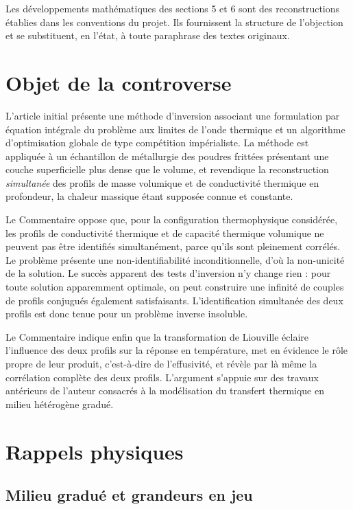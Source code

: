 \documentclass[11pt,a4paper]{article}
\begin{document}
Les développements mathématiques des sections 5 et 6 sont des reconstructions établies dans les
conventions du projet. Ils fournissent la structure de l'objection et se substituent, en l'état, à toute
paraphrase des textes originaux.

\section{Objet de la controverse}

L'article initial présente une méthode d'inversion associant une formulation par équation intégrale du
problème aux limites de l'onde thermique et un algorithme d'optimisation globale de type compétition
impérialiste. La méthode est appliquée à un échantillon de métallurgie des poudres frittées présentant
une couche superficielle plus dense que le volume, et revendique la reconstruction \emph{simultanée} des
profils de masse volumique et de conductivité thermique en profondeur, la chaleur massique étant
supposée connue et constante.

Le Commentaire oppose que, pour la configuration thermophysique considérée, les profils de conductivité
thermique et de capacité thermique volumique ne peuvent pas être identifiés simultanément, parce qu'ils
sont pleinement corrélés. Le problème présente une non-identifiabilité inconditionnelle, d'où la
non-unicité de la solution. Le succès apparent des tests d'inversion n'y change rien : pour toute
solution apparemment optimale, on peut construire une infinité de couples de profils conjugués
également satisfaisants. L'identification simultanée des deux profils est donc tenue pour un problème
inverse insoluble.

Le Commentaire indique enfin que la transformation de Liouville éclaire l'influence des deux profils sur
la réponse en température, met en évidence le rôle propre de leur produit, c'est-à-dire de l'effusivité,
et révèle par là même la corrélation complète des deux profils. L'argument s'appuie sur des travaux
antérieurs de l'auteur consacrés à la modélisation du transfert thermique en milieu hétérogène gradué.

\section{Rappels physiques}

\subsection{Milieu gradué et grandeurs en jeu}
\end{document}
